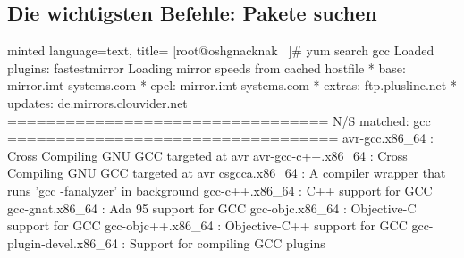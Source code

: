 \documentclass[
    ngerman,
    accentcolor=3b,
    dark_mode,
    fontsize= 12pt,
    a4paper,
    aspectratio=169,
    colorback=true,
    fancy_row_colors,
    leqno,
    fleqn,
    boxarc=3pt,
    fleqn,
]{algoslides}
\begin{document}
    \subsection{Die wichtigsten Befehle: Pakete suchen}
    \begin{frame}[fragile]
        \slidehead{}
        \begin{codeBlock}[fontsize=\tiny]{minted language=text, title=}
            [root@oshgnacknak ~]# yum search gcc
            Loaded plugins: fastestmirror
            Loading mirror speeds from cached hostfile
             * base: mirror.imt-systems.com
             * epel: mirror.imt-systems.com
             * extras: ftp.plusline.net
             * updates: de.mirrors.clouvider.net
            ================================= N/S matched: gcc ==================================
            avr-gcc.x86_64 : Cross Compiling GNU GCC targeted at avr
            avr-gcc-c++.x86_64 : Cross Compiling GNU GCC targeted at avr
            csgcca.x86_64 : A compiler wrapper that runs 'gcc -fanalyzer' in background
            gcc-c++.x86_64 : C++ support for GCC
            gcc-gnat.x86_64 : Ada 95 support for GCC
            gcc-objc.x86_64 : Objective-C support for GCC
            gcc-objc++.x86_64 : Objective-C++ support for GCC
            gcc-plugin-devel.x86_64 : Support for compiling GCC plugins
        \end{codeBlock}
    \end{frame}
    \begin{frame}[fragile]
        \slidehead{}
    \end{frame}
\end{document}
